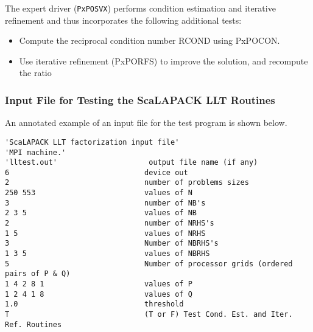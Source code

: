 \documentclass[11pt]{report}
\newcommand{\dent}{\hspace*{\parindent}}
\begin{document}
The expert driver ({\tt PxPOSVX}) performs condition estimation and
iterative refinement and thus incorporates the following additional
tests:

\begin{itemize}
\item
Compute the reciprocal condition number RCOND using PxPOCON.
\item
Use iterative refinement (PxPORFS) to improve the solution,
and recompute the ratio
\end{itemize}

\subsubsection{Input File for Testing the ScaLAPACK LLT Routines}
\dent
An annotated example of an input file for the
test program is shown below.

\begin{verbatim}
'ScaLAPACK LLT factorization input file'
'MPI machine.'
'lltest.out'                     output file name (if any)
6                               device out
2                               number of problems sizes
250 553                         values of N
3                               number of NB's
2 3 5                           values of NB
2                               number of NRHS's
1 5                             values of NRHS
3                               Number of NBRHS's
1 3 5                           values of NBRHS
5                               Number of processor grids (ordered pairs of P & Q)
1 4 2 8 1                       values of P
1 2 4 1 8                       values of Q
1.0                             threshold
T                               (T or F) Test Cond. Est. and Iter. Ref. Routines
\end{verbatim}
\end{document}
